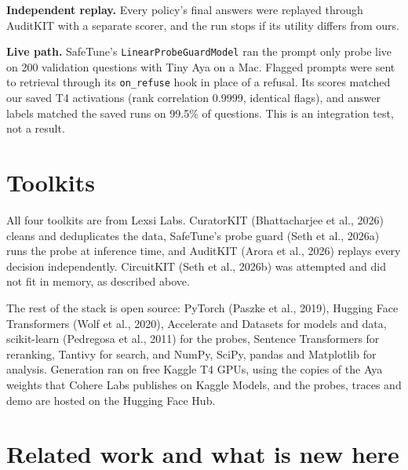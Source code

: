 \documentclass[11pt,a4paper]{article}
\begin{document}
\textbf{Independent replay.} Every policy's final answers were replayed through AuditKIT with a separate scorer, and the run stops if its utility differs from ours.

\textbf{Live path.} SafeTune's \nolinkurl{LinearProbeGuardModel} ran the prompt only probe live on 200 validation questions with Tiny Aya on a Mac. Flagged prompts were sent to retrieval through its \nolinkurl{on_refuse} hook in place of a refusal. Its scores matched our saved T4 activations (rank correlation 0.9999, identical flags), and answer labels matched the saved runs on 99.5\% of questions. This is an integration test, not a result.

\section{Toolkits}

All four toolkits are from Lexsi Labs. CuratorKIT (Bhattacharjee et al., 2026) cleans and deduplicates the data, SafeTune's probe guard (Seth et al., 2026a) runs the probe at inference time, and AuditKIT (Arora et al., 2026) replays every decision independently. CircuitKIT (Seth et al., 2026b) was attempted and did not fit in memory, as described above.

The rest of the stack is open source: PyTorch (Paszke et al., 2019), Hugging Face Transformers (Wolf et al., 2020), Accelerate and Datasets for models and data, scikit-learn (Pedregosa et al., 2011) for the probes, Sentence Transformers for reranking, Tantivy for search, and NumPy, SciPy, pandas and Matplotlib for analysis. Generation ran on free Kaggle T4 GPUs, using the copies of the Aya weights that Cohere Labs publishes on Kaggle Models, and the probes, traces and demo are hosted on the Hugging Face Hub.

\section{Related work and what is new here}
\end{document}
